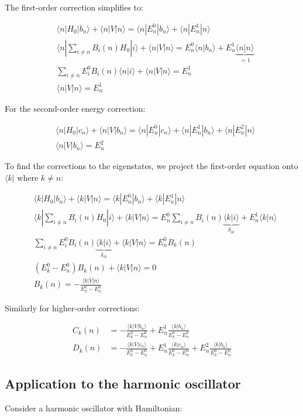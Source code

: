 \documentclass[italian]{HKNdocument}
\begin{document}
The first-order correction simplifies to:

\begin{align}
&\langle n|H_0|b_n\rangle+\langle n|V|n\rangle=\langle n|E_n^0|b_n\rangle+\langle n|E_n^1|n\rangle\\
&\langle n|\sum_{i\neq n}B_i(n)H_0|i\rangle+\langle n|V|n\rangle=E_n^0\langle n|b_n\rangle+E_n^1\underbrace{\langle n|n\rangle}_{=1}\\
&\sum_{i\neq n}E_i^0B_i(n)\langle n|i\rangle+\langle n|V|n\rangle=E_n^1 \\
&\langle n|V|n\rangle=E_n^1
\end{align}

For the second-order energy correction:

\begin{align}
&\langle n|H_0|c_n\rangle+\langle n|V|b_n\rangle=\langle n|E_n^0|c_n\rangle+\langle n|E_n^1|b_n\rangle+\langle n|E_n^2|n\rangle\\
&\langle n|V|b_n\rangle=E_n^2
\end{align}

To find the corrections to the eigenstates, we project the first-order equation onto $\langle k|$ where $k\neq n$:

\begin{align}
&\langle k|H_0|b_n\rangle+\langle k|V|n\rangle=\langle k|E_n^0|b_n\rangle+\langle k|E_n^1|n\rangle\\
&\langle k|\sum_{i\neq n}B_i(n)H_0|i\rangle+\langle k|V|n\rangle=E_n^0\sum_{i\neq n}B_i(n)\underbrace{\langle k|i\rangle}_{\delta_{ik}}+E_n^1\langle k|n\rangle\\
&\sum_{i\neq n}E_i^0B_i(n)\underbrace{\langle k|i\rangle}_{\delta_{ik}}+\langle k|V|n\rangle=E_n^0B_k(n) \\
&(E_k^0-E_n^0)B_k(n)+\langle k|V|n\rangle=0\\
&B_k(n)=-\frac{\langle k|V|n\rangle}{E_k^0-E_n^0}
\end{align}

Similarly for higher-order corrections:

\begin{align}
C_k(n)&=-\frac{\langle k|V|b_n\rangle}{E_k^0-E_n^0}+E_n^1\frac{\langle k|b_n\rangle}{E_k^0-E_n^0} \\
D_k(n)&=-\frac{\langle k|V|c_n\rangle}{E_k^0-E_n^0}+E_n^1\frac{\langle k|c_n\rangle}{E_k^0-E_n^0}+E_n^2\frac{\langle k|b_n\rangle}{E_k^0-E_n^0}
\end{align}

\subsection{Application to the harmonic oscillator}
Consider a harmonic oscillator with Hamiltonian:
\end{document}
